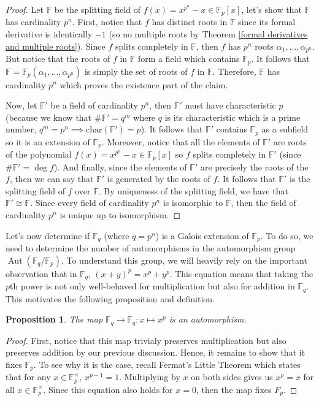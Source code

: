 \documentclass{article}
\theoremstyle{plain}
\newtheorem{proposition}[theorem]{Proposition}
\theoremstyle{definition}
\newcommand{\F}{\mathbb{F}}
\DeclareMathOperator{\Aut}{Aut}
\newcommand{\isomorphic}{\cong}
\begin{document}
\begin{proof}
    Let $\F$ be the splitting field of $f(x) = x^{p^n} - x \in \F_p[x]$, let's show that $\F$ has cardinality $p^n$. First, notice that $f$ has distinct roots in $\F$ since its formal derivative is identically $-1$ (so no multiple roots by Theorem \ref{formal derivatives and multiple roots}). Since $f$ splits completely in $\F$, then $f$ has $p^n$ roots $\alpha_1, ..., \alpha_{p^n}$. But notice that the roots of $f$ in $\F$ form a field which contains $\F_p$. It follows that $\F = \F_p(\alpha_1, ..., \alpha_{p^n})$ is simply the set of roots of $f$ in $\F$. Therefore, $\F$ has cardinality $p^n$ which proves the existence part of the claim.
    
    Now, let $\F'$ be a field of cardinality $p^n$, then $\F'$ must have characteristic $p$ (because we know that $\# \F' = q^m$ where $q$ is its characteristic which is a prime number, $q^m = p^n \implies \text{char}(\F') = p$). It follows that $\F'$ contains $\F_p$ as a subfield so it is an extension of $\F_p$. Moreover, notice that all the elements of $\F'$ are roots of the polynomial $f(x) = x^{p^n} - x \in \F_p[x]$ so $f$ splits completely in $\F'$ (since $\# \F' = \deg f$). And finally, since the elements of $\F'$ are precisely the roots of the $f$, then we can say that $\F'$ is generated by the roots of $f$. It follows that $\F'$ is the splitting field of $f$ over $\F$. By uniqueness of the splitting field, we have that $\F' \isomorphic \F$. Since every field of cardinality $p^n$ is isomorphic to $\F$, then the field of cardinality $p^n$ is unique up to isomorphism. 
\end{proof}

Let's now determine if $\F_q$ (where $q = p^n$) is a Galois extension of $\F_p$. To do so, we need to determine the number of automorphisms in the automorphism group $\Aut(\F_q / \F_p)$. To understand this group, we will heavily rely on the important observation that in $\F_q$, $(x + y)^p = x^p + y^p$. This equation means that taking the $p$th power is not only well-behaved for multiplication but also for addition in $\F_q$. This motivates the following proposition and definition.

\begin{proposition}
    The map $\F_q \to \F_q : x \mapsto x^p$ is an automorphism.
\end{proposition}

\begin{proof}
    First, notice that this map trivialy preserves multiplication but also preserves addition by our previous discussion. Hence, it remains to show that it fixes $\F_p$. To see why it is the case, recall Fermat's Little Theorem which states that for any $x \in \F_p^{\times}$, $x^{p-1} = 1$. Multiplying by $x$ on both sides gives us $x^p = x$ for all $x \in \F_p^{\times}$. Since this equation also holds for $x = 0$, then the map fixes $F_p$. 
\end{proof}
\end{document}
